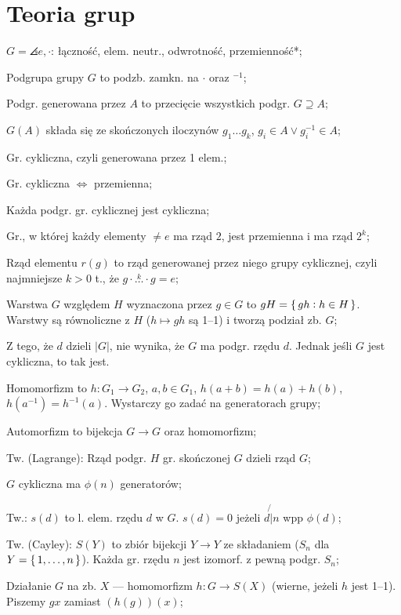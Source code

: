 \section{Teoria grup}

$G = \angles{e, \cdot}$: łączność, elem. neutr., odwrotność, przemienność*;

Podgrupa grupy $G$ to podzb. zamkn. na $\cdot$ oraz $^{-1}$;

Podgr. generowana przez $A$ to przecięcie wszystkich podgr. $G \supseteq A$;

$G(A)$ składa się ze skończonych iloczynów $g_1\dots g_k$,
  $g_i\in A \lor g_i^{-1} \in A$;

Gr. cykliczna, czyli generowana przez 1 elem.;

Gr. cykliczna $\Leftrightarrow$ przemienna;

Każda podgr. gr. cyklicznej jest cykliczna;

Gr., w której każdy elementy $\neq e$ ma rząd $2$, jest przemienna
  i ma rząd $2^k$;

Rząd elementu $r(g)$ to rząd generowanej przez niego grupy cyklicznej, czyli
najmniejsze $k > 0$ t., że $g\cdot\overset{k}{\ldots}\cdot g=e$;

Warstwa $G$ względem $H$ wyznaczona przez $g\in G$ to
  $gH = \set{gh : h \in H}$. Warstwy są równoliczne z $H$
  ($h \mapsto gh$ są 1--1) i tworzą podział zb. $G$;

Z tego, że $d$ dzieli $|G|$, nie wynika, że $G$ ma podgr. rzędu $d$. Jednak
jeśli $G$ jest cykliczna, to tak jest.

Homomorfizm to $h: G_1 \to G_2$, $a,b\in G_1$, $h(a+b)=h(a)+h(b)$,
  $h(a^{-1}) = h^{-1}(a)$. Wystarczy go zadać na generatorach grupy;

Automorfizm to bijekcja $G\to G$ oraz homomorfizm;

Tw. (Lagrange): Rząd podgr. $H$ gr. skończonej $G$ dzieli rząd $G$;

$G$ cykliczna ma $\phi(n)$ generatorów;

Tw.: $s(d)$ to l. elem. rzędu $d$ w $G$. $s(d) = 0$ jeżeli $d \not{|} n$
  wpp $\phi(d)$;

Tw. (Cayley): $S(Y)$ to zbiór bijekcji $Y \rightarrow Y$ ze składaniem
  ($S_n$ dla $Y=\set{1,\dots,n}$). Każda gr. rzędu $n$ jest izomorf. z pewną
  podgr. $S_n$;

Działanie $G$ na zb. $X$ --- homomorfizm $h: G \rightarrow S(X)$ (wierne,
jeżeli $h$ jest 1--1). Piszemy $gx$ zamiast $(h(g))(x)$;

